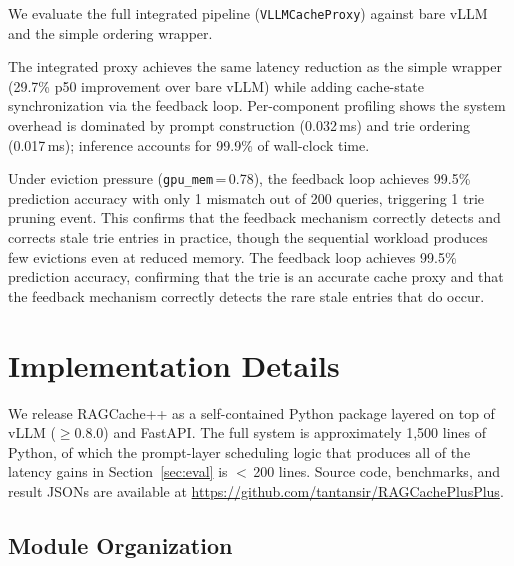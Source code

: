 \documentclass{article}
\begin{document}
We evaluate the full integrated pipeline (\texttt{VLLMCacheProxy}) against bare vLLM and the simple ordering wrapper.


The integrated proxy achieves the same latency reduction as the simple wrapper (29.7\% p50 improvement over bare vLLM) while adding cache-state synchronization via the feedback loop. Per-component profiling shows the system overhead is dominated by prompt construction (0.032\,ms) and trie ordering (0.017\,ms); inference accounts for 99.9\% of wall-clock time.

Under eviction pressure (\texttt{gpu\_mem}\,=\,0.78), the feedback loop achieves 99.5\% prediction accuracy with only 1 mismatch out of 200 queries, triggering 1 trie pruning event. This confirms that the feedback mechanism correctly detects and corrects stale trie entries in practice, though the sequential workload produces few evictions even at reduced memory. The feedback loop achieves 99.5\% prediction accuracy, confirming that the trie is an accurate cache proxy and that the feedback mechanism correctly detects the rare stale entries that do occur.

\section{Implementation Details}
\label{sec:impl}

We release RAGCache++ as a self-contained Python package layered on top of vLLM ($\geq$0.8.0) and FastAPI. The full system is approximately 1{,}500 lines of Python, of which the prompt-layer scheduling logic that produces all of the latency gains in Section~\ref{sec:eval} is $<$\,200 lines. Source code, benchmarks, and result JSONs are available at \url{https://github.com/tantansir/RAGCachePlusPlus}.

\subsection{Module Organization}
\end{document}
